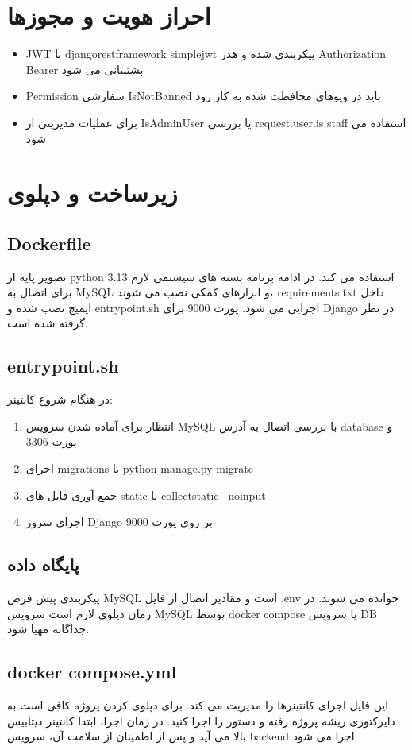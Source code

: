\section{احراز هویت و مجوزها}
\begin{itemize}
  \item JWT با djangorestframework simplejwt پیکربندی شده و هدر Authorization Bearer پشتیبانی می شود
  \item Permission سفارشی IsNotBanned باید در ویوهای محافظت شده به کار رود
  \item برای عملیات مدیریتی از IsAdminUser یا بررسی request.user.is staff استفاده می شود
\end{itemize}

\section{زیرساخت و دپلوی}
\subsection{Dockerfile}
تصویر پایه از python 3.13 استفاده می کند. در ادامه برنامه بسته های سیستمی لازم برای اتصال به MySQL و ابزارهای کمکی نصب می شوند، requirements.txt داخل ایمیج نصب شده و entrypoint.sh اجرایی می شود. پورت 9000 برای Django در نظر گرفته شده است.

\subsection{entrypoint.sh}
در هنگام شروع کانتینر:
\begin{enumerate}
  \item انتظار برای آماده شدن سرویس MySQL با بررسی اتصال به آدرس database و پورت 3306
  \item اجرای migrations با python manage.py migrate
  \item جمع آوری فایل های static با collectstatic --noinput
  \item اجرای سرور Django بر روی پورت 9000
\end{enumerate}

\subsection{پایگاه داده}
پیکربندی پیش فرض MySQL است و مقادیر اتصال از فایل .env خوانده می شوند. در زمان دپلوی لازم است سرویس MySQL توسط docker compose یا سرویس DB جداگانه مهیا شود.

\subsection{docker compose.yml}
این فایل اجرای کانتینرها را مدیریت می کند. برای دپلوی کردن پروژه کافی است به دایرکتوری ریشه پروژه رفته و دستور  را اجرا کنید. در زمان اجرا، ابتدا کانتینر دیتابیس بالا می آید و پس از اطمینان از سلامت آن، سرویس backend اجرا می شود.

